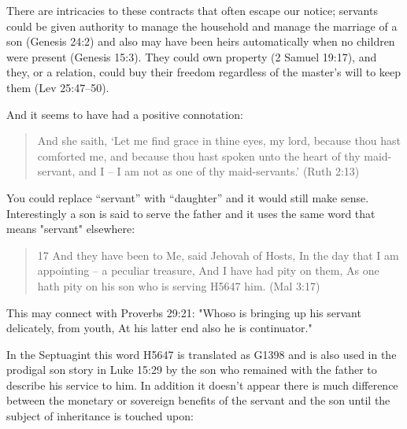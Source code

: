 \documentclass[11pt]{article}
\begin{document}
There are intricacies to these contracts that often escape our notice; servants could be given authority to manage the household and manage the marriage of a son (Genesis 24:2) and also may have been heirs automatically when no children were present (Genesis 15:3). They could own property (2 Samuel 19:17), and they, or a relation, could buy their freedom regardless of the master's will to keep them (Lev 25:47–50).

And it seems to have had a positive connotation:
\begin{quote}
And she saith, `Let me find grace in thine eyes, my lord, because thou hast comforted me, and because thou hast spoken unto the heart of thy maid-servant, and I -- I am not as one of thy maid-servants.' (Ruth 2:13)
\end{quote}
You could replace “servant” with “daughter” and it would still make sense. Interestingly a son is said to serve the father and it uses the same word that means "servant" elsewhere:
\begin{quote}
17 And they have been to Me, said Jehovah of Hosts, In the day that I am appointing -- a peculiar treasure, And I have had pity on them, As one hath pity on his son who is serving H5647 him. (Mal 3:17)
\end{quote}

This may connect with Proverbs 29:21: "Whoso is bringing up his servant delicately, from youth, At his latter end also he is continuator." \newline

In the Septuagint this word H5647 is translated as G1398 and is also used in the prodigal son story in Luke 15:29 by the son who remained with the father to describe his service to him. In addition it doesn't appear there is much difference between the monetary or sovereign benefits of the servant and the son until the subject of inheritance is touched upon:
\end{document}
